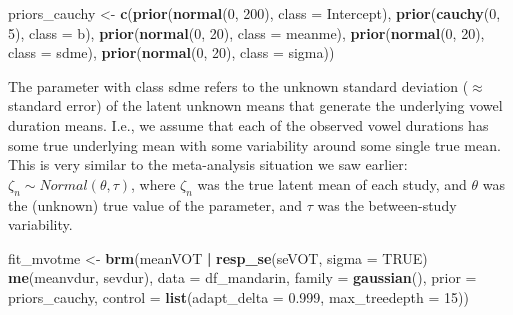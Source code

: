 \documentclass[12pt,]{krantz}
\newenvironment{Shaded}{\begin{snugshade}}{\end{snugshade}}
\newcommand{\DataTypeTok}[1]{\textcolor[rgb]{0.13,0.29,0.53}{#1}}
\newcommand{\DecValTok}[1]{\textcolor[rgb]{0.00,0.00,0.81}{#1}}
\newcommand{\FloatTok}[1]{\textcolor[rgb]{0.00,0.00,0.81}{#1}}
\newcommand{\KeywordTok}[1]{\textcolor[rgb]{0.13,0.29,0.53}{\textbf{#1}}}
\newcommand{\NormalTok}[1]{#1}
\newcommand{\OperatorTok}[1]{\textcolor[rgb]{0.81,0.36,0.00}{\textbf{#1}}}
\newcommand{\OtherTok}[1]{\textcolor[rgb]{0.56,0.35,0.01}{#1}}
\newcommand{\StringTok}[1]{\textcolor[rgb]{0.31,0.60,0.02}{#1}}
\theoremstyle{definition}
\theoremstyle{definition}
\theoremstyle{definition}
\theoremstyle{remark}
\begin{document}
\begin{Shaded}
\begin{Highlighting}[]
\NormalTok{priors_cauchy <-}\StringTok{ }\KeywordTok{c}\NormalTok{(}\KeywordTok{prior}\NormalTok{(}\KeywordTok{normal}\NormalTok{(}\DecValTok{0}\NormalTok{, }\DecValTok{200}\NormalTok{), }\DataTypeTok{class =}\NormalTok{ Intercept),}
                   \KeywordTok{prior}\NormalTok{(}\KeywordTok{cauchy}\NormalTok{(}\DecValTok{0}\NormalTok{, }\DecValTok{5}\NormalTok{), }\DataTypeTok{class =}\NormalTok{ b),}
                   \KeywordTok{prior}\NormalTok{(}\KeywordTok{normal}\NormalTok{(}\DecValTok{0}\NormalTok{, }\DecValTok{20}\NormalTok{), }\DataTypeTok{class =}\NormalTok{ meanme),}
                   \KeywordTok{prior}\NormalTok{(}\KeywordTok{normal}\NormalTok{(}\DecValTok{0}\NormalTok{, }\DecValTok{20}\NormalTok{), }\DataTypeTok{class =}\NormalTok{ sdme),}
                   \KeywordTok{prior}\NormalTok{(}\KeywordTok{normal}\NormalTok{(}\DecValTok{0}\NormalTok{, }\DecValTok{20}\NormalTok{), }\DataTypeTok{class =}\NormalTok{ sigma))}
\end{Highlighting}
\end{Shaded}

The parameter with class sdme refers to the unknown standard deviation (\(\approx\) standard error) of the latent unknown means that generate the underlying vowel duration means. I.e., we assume that each of the observed vowel durations has some true underlying mean with some variability around some single true mean. This is very similar to the meta-analysis situation we saw earlier: \(\zeta_n \sim Normal(\theta,\tau)\), where \(\zeta_n\) was the true latent mean of each study, and \(\theta\) was the (unknown) true value of the parameter, and \(\tau\) was the between-study variability.

\begin{Shaded}
\begin{Highlighting}[]
\NormalTok{fit_mvotme <-}\StringTok{ }\KeywordTok{brm}\NormalTok{(meanVOT }\OperatorTok{|}\StringTok{ }\KeywordTok{resp_se}\NormalTok{(seVOT, }\DataTypeTok{sigma =} \OtherTok{TRUE}\NormalTok{) }\OperatorTok{~}
\StringTok{                    }\KeywordTok{me}\NormalTok{(meanvdur, sevdur),}
                  \DataTypeTok{data =}\NormalTok{ df_mandarin, }
                  \DataTypeTok{family =} \KeywordTok{gaussian}\NormalTok{(), }
                  \DataTypeTok{prior =}\NormalTok{ priors_cauchy,}
                  \DataTypeTok{control =} \KeywordTok{list}\NormalTok{(}\DataTypeTok{adapt_delta =} \FloatTok{0.999}\NormalTok{,}
                                 \DataTypeTok{max_treedepth =} \DecValTok{15}\NormalTok{))}
\end{Highlighting}
\end{Shaded}
\end{document}
